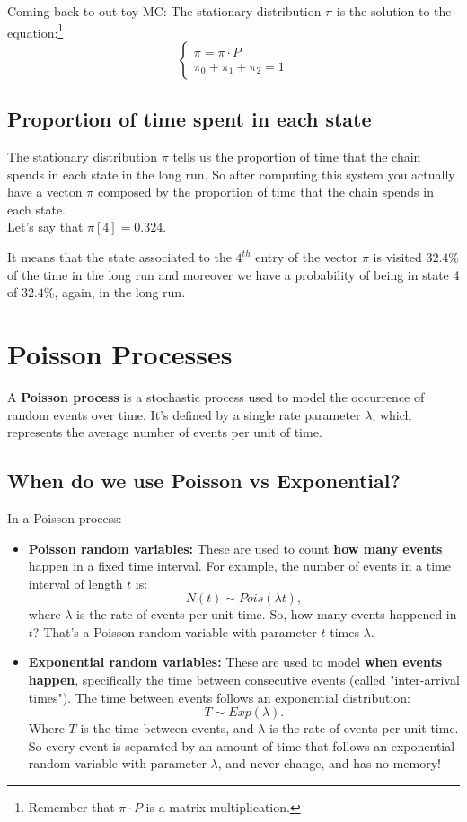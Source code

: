\documentclass[a4paper]{article}
\begin{document}
Coming back to out toy MC:
The stationary distribution $\pi$ is the solution to the equation:\footnote{Remember that $\pi \cdot P$ is a matrix multiplication.}
$$\begin{cases} \pi = \pi \cdot P \\
    \pi_0 + \pi_1 + \pi_2 = 1
\end{cases}$$

\subsection{Proportion of time spent in each state}
The stationary distribution $\pi$ tells us the proportion of time that the chain spends in each state in the long run.
So after computing this system you actually have a vecton $\pi$ composed by the proportion of time that the chain spends in each state.\\
Let's say that $\pi[4] = 0.324$. 

It means that the state associated to the $4^{th}$ entry of the vector $\pi$ is visited $32.4\%$ of the time in the long run and moreover we have a probability of being in state 4 of $32.4\%$, again, in the long run.


\section{Poisson Processes}

A \textbf{Poisson process} is a stochastic process used to model the occurrence of random events over time. It’s defined by a single rate parameter $\lambda$, which represents the average number of events per unit of time.

\subsection{When do we use Poisson vs Exponential?}
In a Poisson process:
\begin{itemize}
    \item \textbf{Poisson random variables:} These are used to count \textbf{how many events} happen in a fixed time interval. 
    For example, the number of events in a time interval of length $t$ is:
    \[
    N(t) \sim Pois(\lambda t),
    \]
    where $\lambda$ is the rate of events per unit time.
    So, how many events happened in $t$? That's a Poisson random variable with parameter $t$ times $\lambda$.

    \item \textbf{Exponential random variables:} These are used to model \textbf{when events happen}, specifically the time between consecutive events (called "inter-arrival times"). 
    The time between events follows an exponential distribution:
    \[
    T \sim Exp(\lambda).
    \]
    Where $T$ is the time between events, and $\lambda$ is the rate of events per unit time.
    So every event is separated by an amount of time that follows an exponential random variable with parameter $\lambda$, and never change, and has no memory!
\end{itemize}
\end{document}
